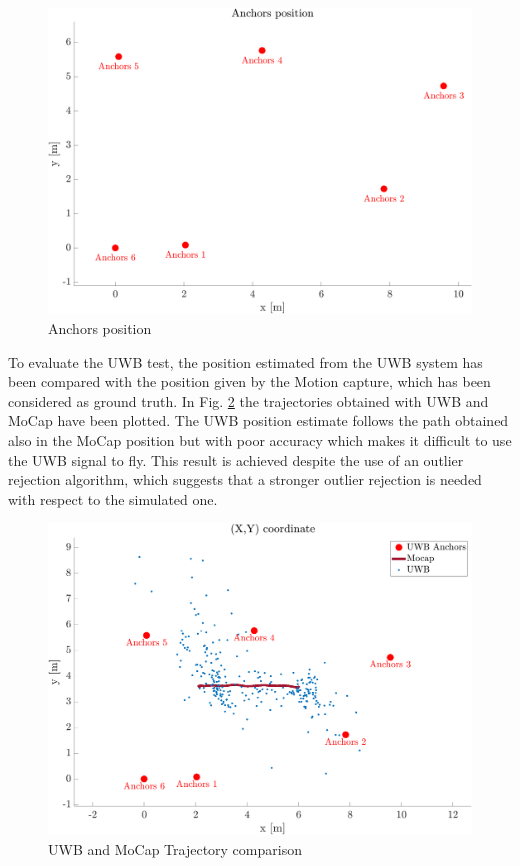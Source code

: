 \documentclass[journal]{IEEEtran}
\begin{document}
\begin{figure}
    \centering
    \includegraphics[scale=0.22]{Images/uwb_test/anchors.png}
    \caption{Anchors position}
    \label{fig:anchors}
\end{figure}

To evaluate the UWB test, the position estimated from the UWB system has been compared with the position given by the Motion capture, which has been considered as ground truth. In Fig. \ref{fig:uwb_mocap} the trajectories obtained with UWB and MoCap have been plotted. The UWB position estimate follows the path obtained also in the MoCap position but with poor accuracy which makes it difficult to use the UWB signal to fly. This result is achieved despite the use of an outlier rejection algorithm, which suggests that a stronger outlier rejection is needed with respect to the simulated one.

\begin{figure}
    \centering
    \includegraphics[scale=0.22]{Images/uwb_test/uwb_xy_coordinate.png}
    \caption{UWB and MoCap Trajectory comparison}
    \label{fig:uwb_mocap}
\end{figure}
\end{document}
